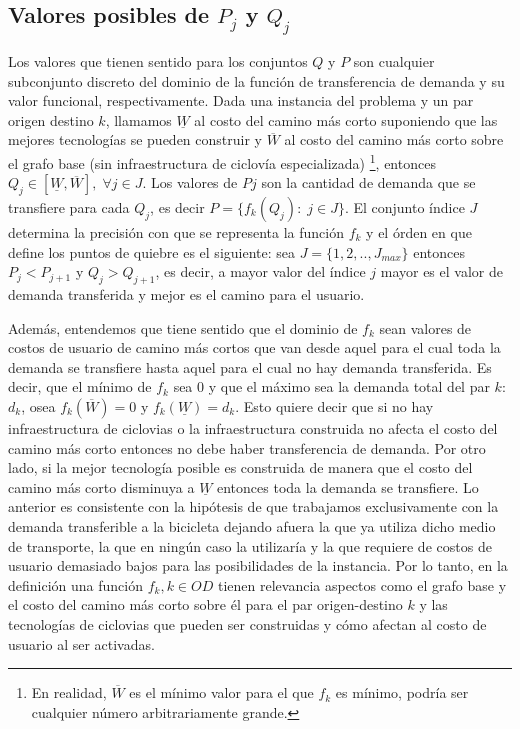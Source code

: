 \subsection{Valores posibles de $P_j$ y $Q_j$}

Los valores que tienen sentido para los conjuntos $Q$ y $P$ son cualquier subconjunto discreto del dominio de la función de transferencia de demanda y su valor funcional, respectivamente. Dada una instancia del problema y un par origen destino $k$, llamamos $\underline{W}$ al costo del camino más corto suponiendo que las mejores tecnologías se pueden construir y $\overline{W}$ al costo del camino más corto sobre el grafo base (sin infraestructura de ciclovía especializada) \footnote{En realidad, $\overline{W}$ es el mínimo valor para el que $f_k$ es mínimo, podría ser cualquier número arbitrariamente grande.}, entonces $Q_j \in [\underline{W}, \overline{W}],\; \forall j \in J$. Los valores de $Pj$ son la cantidad de demanda que se transfiere para cada $Q_j$, es decir $P = \{f_k(Q_j):\; j \in J\}$. El conjunto índice $J$ determina la precisión con que se representa la función $f_k$ y el órden en que define los puntos de quiebre es el siguiente: sea $J = \{1, 2, .. , J_{max}\}$ entonces $P_j < P_{j+1}$ y $Q_j > Q_{j+1}$, es decir, a mayor valor del índice $j$ mayor es el valor de demanda transferida y mejor es el camino para el usuario.

Además, entendemos que tiene sentido que el dominio de $f_k$ sean valores de costos de usuario de camino más cortos que van desde aquel para el cual toda la demanda se transfiere hasta aquel para el cual no hay demanda transferida. Es decir, que el mínimo de $f_k$ sea 0 y que el máximo sea la demanda total del par $k$: $d_k$, osea $f_k(\overline{W}) = 0$ y $f_k(\underline{W}) = d_k$. Esto quiere decir que si no hay infraestructura de ciclovias o la infraestructura construida no afecta el costo del camino más corto entonces no debe haber transferencia de demanda. Por otro lado, si la mejor tecnología posible es construida de manera que el costo del camino más corto disminuya a $\underline{W}$ entonces toda la demanda se transfiere. Lo anterior es consistente con la hipótesis de que trabajamos exclusivamente con la demanda transferible a la bicicleta dejando afuera la que ya utiliza dicho medio de transporte, la que en ningún caso la utilizaría y la que requiere de costos de usuario demasiado bajos para las posibilidades de la instancia. Por lo tanto, en la definición una función $f_k, k \in OD$ tienen relevancia aspectos como el grafo base y el costo del camino más corto sobre él para el par origen-destino $k$ y las tecnologías de ciclovias que pueden ser construidas y cómo afectan al costo de usuario al ser activadas.

